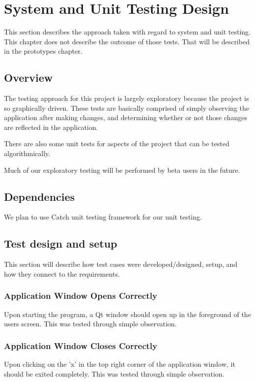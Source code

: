 

\chapter{System and Unit Testing Design}
This section describes the approach taken with regard to system and unit testing.    This chapter does not describe the outcome of those tests.  That will be described in the prototypes chapter.  

\section{Overview}
The testing approach for this project is largely exploratory because the project is so graphically driven. These tests are basically comprised of simply observing the application after making changes, and determining whether or not those changes are reflected in the application.

There are also some unit tests for aspects of the project that can be tested algorithmically.

Much of our exploratory testing will be performed by beta users in the future.

\section{Dependencies}
We plan to use Catch unit testing framework for our unit testing.


\section{Test design and setup}
This section will describe how test cases were developed/designed, setup, and how they connect to the requirements.

\subsection{Application Window Opens Correctly}
Upon starting the program, a Qt window should open up in the foreground of the users screen. This was tested through simple observation.

\subsection{Application Window Closes Correctly}
Upon clicking on the 'x' in the top right corner of the application window, it should be exited completely. This was tested through simple observation.

